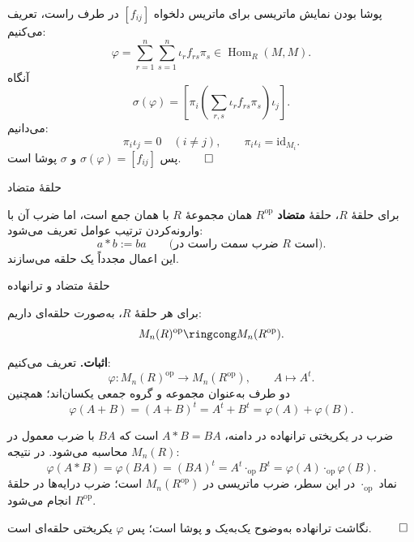 \begin{frame}[t]{پوشا بودن نمایش ماتریسی}
    \label{lec12:matrix-surjectivity}
    برای ماتریس دلخواه $[f_{ij}]$ در طرف راست، تعریف می‌کنیم:
    \[
        \varphi=\sum_{r=1}^{n}\sum_{s=1}^{n}\iota_r f_{rs}\pi_s
        \in\operatorname{Hom}_R(M,M).
    \]
    آنگاه
    \[
        \sigma(\varphi)=
        \left[\pi_i\left(\sum_{r,s}\iota_r f_{rs}\pi_s\right)\iota_j\right].
    \]
    می‌دانیم:
    \[
        \pi_i\iota_j=0\quad(i\ne j),\qquad
        \pi_i\iota_i=\mathrm{id}_{M_i}.
    \]
    پس $\sigma(\varphi)=[f_{ij}]$ و $\sigma$ پوشا است.\hfill$\qed$
\end{frame}

\begin{frame}[t]{حلقهٔ متضاد}
    \label{lec12:opposite-ring}
    \begin{definition}
        برای حلقهٔ $R$، حلقهٔ \textbf{متضاد} $R^{\mathrm{op}}$ همان مجموعهٔ $R$
        با همان جمع است، اما ضرب آن با وارونه‌کردن ترتیب عوامل تعریف می‌شود:
        \[
            a*b:=ba\qquad\text{(ضرب سمت راست در $R$ است).}
        \]
        این اعمال مجدداً یک حلقه می‌سازند.
    \end{definition}
\end{frame}

\begin{frame}[t]{حلقهٔ متضاد و ترانهاده}
    \label{lec12:opposite-transpose}
    \begin{lemma}
        برای هر حلقهٔ $R$، به‌صورت حلقه‌ای داریم:
        \[
            M_n(R)^{\mathrm{op}}\ringcong M_n(R^{\mathrm{op}}).
        \]
    \end{lemma}
    \textbf{اثبات.} تعریف می‌کنیم:
    \[
        \varphi:M_n(R)^{\mathrm{op}}\longrightarrow M_n(R^{\mathrm{op}}),
        \qquad A\longmapsto A^t.
    \]
    دو طرف به‌عنوان مجموعه و گروه جمعی یکسان‌اند؛ همچنین
    \[
        \varphi(A+B)=(A+B)^t=A^t+B^t=\varphi(A)+\varphi(B).
    \]
\end{frame}

\begin{frame}[t]{ضرب در یکریختی ترانهاده}
    \label{lec12:transpose-product}
    در دامنه، $A*B=BA$ است که $BA$ با ضرب معمول در $M_n(R)$ محاسبه می‌شود.
    در نتیجه:
    \[
        \varphi(A*B)=\varphi(BA)=(BA)^t
        = A^t\mathbin{\cdot_{\!\mathrm{op}}}B^t
        =\varphi(A)\mathbin{\cdot_{\!\mathrm{op}}}\varphi(B).
    \]
    نماد $\cdot_{\mathrm{op}}$ در این سطر، ضرب ماتریسی در
    $M_n(R^{\mathrm{op}})$ است؛ ضرب درایه‌ها در حلقهٔ $R^{\mathrm{op}}$ انجام می‌شود.
    \medskip

    نگاشت ترانهاده به‌وضوح یک‌به‌یک و پوشا است؛ پس $\varphi$ یکریختی حلقه‌ای است.
    \hfill$\qed$
\end{frame}

